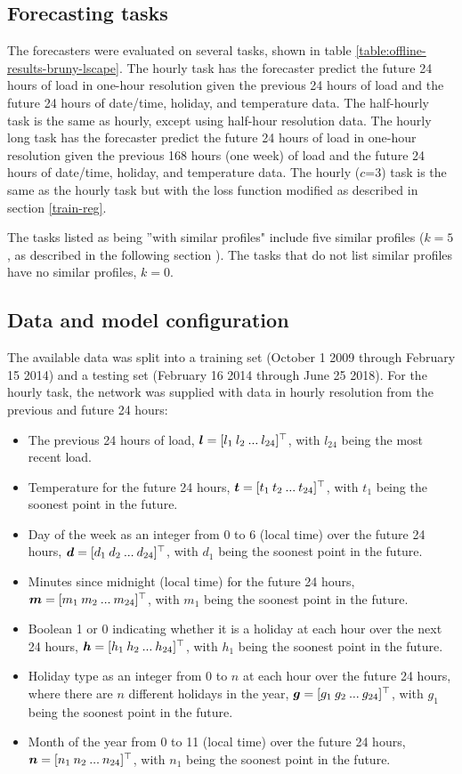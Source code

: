 \subsection{Forecasting tasks}
The forecasters were evaluated on several tasks, shown in table \ref{table:offline-results-bruny-lscape}.
The hourly task has the forecaster predict the future 24 hours of load in one-hour resolution given the previous 24 hours of load and the future 24 hours of date/time, holiday, and temperature data.
The half-hourly task is the same as hourly, except using half-hour resolution data.
The hourly long task has the forecaster predict the future 24 hours of load in one-hour resolution given the previous 168 hours (one week) of load and the future 24 hours of date/time, holiday, and temperature data.
The hourly ($c$=3) task is the same as the hourly task but with the loss function modified as described in section \ref{train-reg}.

The tasks listed as being ''with similar profiles" include five similar profiles ($k=5$, as described in the following section ).
The tasks that do not list similar profiles have no similar profiles, $k=0$.

\subsection{Data and  model configuration}
\label{data-model-config}
The available data was split into a training set (October 1 2009 through February 15 2014) and a testing set (February 16 2014 through June 25 2018).
For the hourly task, the network was supplied with data in hourly resolution from the previous and future 24 hours:
\begin{itemize}
	\item The previous 24 hours of load, ${\bm{l}} = [ l_1 \: l_2 \: ...  \: l_{24}]^\top$, with $l_{24}$ being the most recent load.
	\item Temperature for the future 24 hours, ${\bm{t}} = [t_1 \: t_2 \: ... \: t_{24}]^\top$, with $t_1$ being the soonest point in the future.
	\item Day of the week as an integer from 0 to 6 (local time) over the future 24 hours, ${\bm{d}} = [d_1 \: d_2 \: ... \: d_{24}]^\top$, with $d_1$ being the soonest point in the future.
	\item Minutes since midnight (local time) for the future 24 hours, ${\bm{m}} = [m_1 \: m_2 \: ... \: m_{24}]^\top$, with $m_1$ being the soonest point in the future.
	\item Boolean 1 or 0 indicating whether it is a holiday at each hour over the next 24 hours, ${\bm{h}} = [h_1 \: h_2 \: ... \: h_{24}]^\top$, with $h_1$ being the soonest point in the future.
	\item Holiday type as an integer from 0 to $n$ at each hour over the future 24 hours, where there are $n$ different holidays in the year, ${\bm{g}} = [g_1 \: g_2 \: ... \: g_{24}]^\top$, with $g_1$ being the soonest point in the future.
	\item Month of the year from 0 to 11 (local time) over the future 24 hours, ${\bm{n}} = [n_1 \: n_2 \: ... \: n_{24}]^\top$, with $n_1$ being the soonest point in the future.
\end{itemize}

